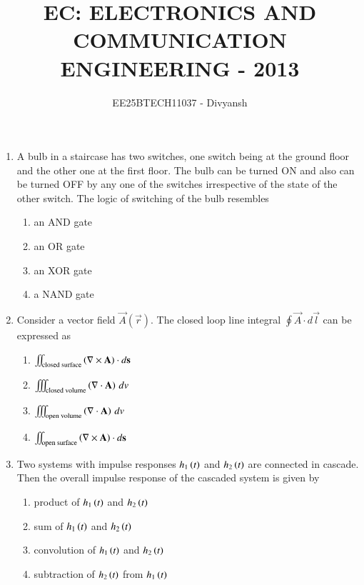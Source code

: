 \documentclass[journal,12pt,onecolumn]{IEEEtran}
\title{EC: ELECTRONICS AND COMMUNICATION ENGINEERING - 2013}
\author{EE25BTECH11037 - Divyansh}
\theoremstyle{remark}
\begin{document}
\maketitle

\begin{enumerate}

\item A bulb in a staircase has two switches, one switch being at the ground floor and the other one at the first floor. The bulb can be turned ON and also can be turned OFF by any one of the switches irrespective of the state of the other switch. The logic of switching of the bulb resembles
\begin{multicols}{4}
\begin{enumerate}
    \item an AND gate
    \item an OR gate
    \item an XOR gate
    \item a NAND gate
\end{enumerate}
\end{multicols}
\hfill {}

\item Consider a vector field $\vec{A}(\vec{r})$. The closed loop line integral $\oint \vec{A} \cdot d\vec{l}$ can be expressed as
\begin{enumerate}
    \item $\iint_{\text{closed surface}} \left(\nabla \times \mathbf{A}\right) \cdot d\mathbf{s}$
    \item $\iiint_{\text{closed volume}} \left(\nabla \cdot \mathbf{A}\right) \, dv$
    \item $\iiint_{\text{open volume}} \left(\nabla \cdot \mathbf{A}\right) \, dv$
    \item $\iint_{\text{open surface}} \left(\nabla \times \mathbf{A}\right) \cdot d\mathbf{s}$
\end{enumerate}
\hfill {}

\item Two systems with impulse responses $h_1\left(t\right)$ and $h_2\left(t\right)$ are connected in cascade. Then the overall impulse response of the cascaded system is given by
\begin{enumerate}
    \item product of $h_1\left(t\right)$ and $h_2\left(t\right)$
    \item sum of $h_1\left(t\right)$ and $h_2\left(t\right)$
    \item convolution of $h_1\left(t\right)$ and $h_2\left(t\right)$
    \item subtraction of $h_2\left(t\right)$ from $h_1\left(t\right)$
\end{enumerate}
\hfill {}


\end{enumerate}
\end{document}
